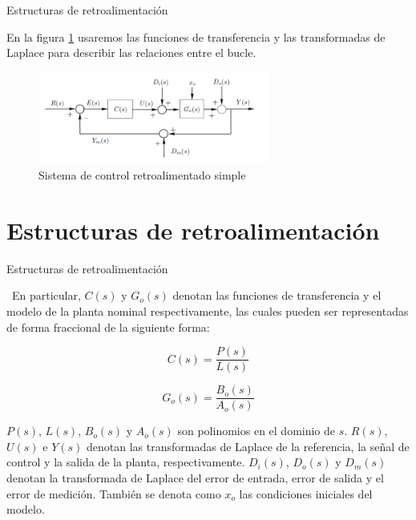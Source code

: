 \documentclass{beamer}
\begin{document}
\begin{frame}{Estructuras de retroalimentación}
\begin{justify}

En la figura \ref{lazo cerrado} usaremos las funciones de transferencia y las transformadas de Laplace para describir las relaciones entre el bucle. 

\begin{figure}[H]
    \centering
    \includegraphics[width=3in]{imagenes/sistema de control retroalimentado simple.PNG}
    \caption{Sistema de control retroalimentado simple}
    \label{lazo cerrado}
\end{figure}


\end{justify}
\end{frame}

\section{Estructuras de retroalimentación}
\begin{frame}{Estructuras de retroalimentación}
\begin{justify}
\footnotesize
\
En particular, $C(s)$ y $G_o(s)$ denotan las funciones de transferencia y el modelo de la planta nominal respectivamente, las cuales pueden ser representadas de forma fraccional de la siguiente forma:

\[C(s)=\frac{P(s)}{L(s)}\]

\[G_o(s)=\frac{B_o(s)}{A_o(s)}\]

\vspace{0.3cm}
$P(s)$, $L(s)$, $B_o(s)$ y $A_o(s)$ son polinomios en el dominio de $s$. $R(s)$, $U(s)$ e $Y(s)$ denotan las transformadas de Laplace de la referencia, la señal de control y la salida de la planta, respectivamente. $D_i(s)$, $D_o(s)$ y $D_m(s)$ denotan la transformada de Laplace del error de entrada, error de salida y el error de medición. También se denota como $x_o$ las condiciones iniciales del modelo.

\end{justify}
\end{frame}
\end{document}
